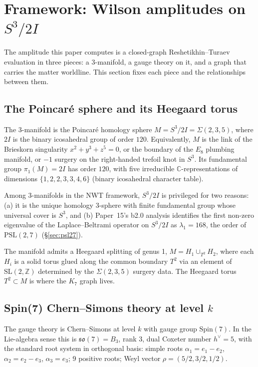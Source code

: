 \documentclass[11pt]{article}
\newcommand{\so}{\mathfrak{so}}
\newcommand{\Spin}{\mathrm{Spin}}
\newcommand{\hv}{h^{\vee}}
\newcommand{\C}{\mathbb{C}}
\newcommand{\Z}{\mathbb{Z}}
\newcommand{\PSL}{\mathrm{PSL}}
\newcommand{\SL}{\mathrm{SL}}
\begin{document}
\section{Framework: Wilson amplitudes on $S^3/2I$}
\label{sec:framework}

The amplitude this paper computes is a closed-graph Reshetikhin--Turaev
evaluation in three pieces: a 3-manifold, a gauge theory on it, and
a graph that carries the matter worldline.  This section fixes
each piece and the relationships between them.

\subsection{The Poincar\'e sphere and its Heegaard torus}
\label{sec:poincare}

The 3-manifold is the Poincar\'e homology sphere
$M = S^3/2I = \Sigma(2,3,5)$, where $2I$ is the binary icosahedral
group of order $120$.  Equivalently, $M$ is the link of the Brieskorn
singularity $x^2 + y^3 + z^5 = 0$, or the boundary of the $E_8$
plumbing manifold, or $-1$ surgery on the right-handed trefoil
knot in $S^3$.  Its fundamental group $\pi_1(M) = 2I$ has order
$120$, with five irreducible $\C$-representations of dimensions
$\{1, 2, 2, 3, 3, 4, 6\}$ (binary icosahedral character table).

Among 3-manifolds in the NWT framework, $S^3/2I$ is privileged for
two reasons: (a) it is the unique homology 3-sphere with finite
fundamental group whose universal cover is $S^3$, and (b) Paper~15's
b2.0 analysis identifies the first non-zero eigenvalue of the
Laplace--Beltrami operator on $S^3/2I$ as $\lambda_1 = 168$, the
order of $\PSL(2,7)$ (\S\ref{sec:psl27}).

The manifold admits a Heegaard splitting of genus 1,
$M = H_1 \cup_{T^2} H_2$, where each $H_i$ is a solid torus glued
along the common boundary $T^2$ via an element of $\SL(2,\Z)$
determined by the $\Sigma(2,3,5)$ surgery data.  The Heegaard torus
$T^2 \subset M$ is where the $K_7$ graph lives.

\subsection{Spin(7) Chern--Simons theory at level $k$}
\label{sec:spin7-CS}

The gauge theory is Chern--Simons at level $k$ with gauge group
$\Spin(7)$.  In the Lie-algebra sense this is $\so(7) = B_3$,
rank 3, dual Coxeter number $\hv = 5$, with the standard root
system in orthogonal basis: simple roots
$\alpha_1 = e_1 - e_2$, $\alpha_2 = e_2 - e_3$, $\alpha_3 = e_3$;
9 positive roots; Weyl vector $\rho = (5/2, 3/2, 1/2)$.
\end{document}
